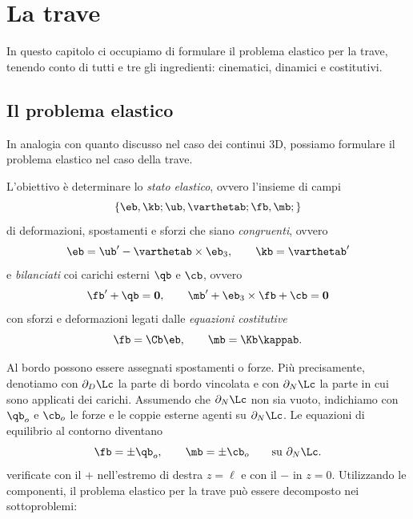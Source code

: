 \chapter{La trave}

 In questo capitolo ci occupiamo di formulare il problema elastico per la trave, tenendo conto di tutti e tre gli ingredienti: cinematici, dinamici e costitutivi. 

\section{Il problema elastico}
In analogia con quanto discusso nel caso dei continui 3D, possiamo formulare il problema elastico nel caso della trave.

L'obiettivo è determinare lo \textit{stato elastico}, ovvero l'insieme di campi
\begin{equation}
\{\eb, \kb ; \ub, \varthetab ;\fb, \mb;  \}
\end{equation}
di deformazioni, spostamenti e sforzi che siano \textit{congruenti}, ovvero
\begin{equation}\label{eqcongrp}
\eb=\ub'-\varthetab\times \eb_3, \qquad \kb=\varthetab'
\end{equation}
e \textit{bilanciati} coi carichi esterni $\qb$ e $\cb$, ovvero
\begin{equation}\label{eqbilp}
\fb'+\qb=\mathbf{0}, \qquad \mb'+\eb_3\times \fb +\cb=\mathbf{0}
\end{equation}
con sforzi e deformazioni legati dalle \textit{equazioni costitutive}
\begin{equation}\label{eqcostp}
\fb=\Cb \eb, \qquad \mb =\Kb \kappab.
\end{equation}

Al bordo possono essere assegnati spostamenti o forze. Più precisamente,  denotiamo con $\partial_D\Lc$ la parte di bordo vincolata e con $\partial_N\Lc$ la parte in cui sono applicati dei carichi. Assumendo che $\partial_N \Lc$ non sia vuoto, indichiamo con $\qb_{o}$ e $\cb_{o}$ le forze e le coppie esterne agenti su  $\partial_N \Lc$. Le equazioni di equilibrio al contorno diventano
\begin{equation}
\fb=\pm \qb_o, \qquad \mb=\pm \cb_{o} \qquad \textrm{su $\partial_N \Lc$}.
\end{equation}
 verificate con il $+$ nell’estremo di destra $z = \ell$ e con il $-$ in $z =0$. Utilizzando le componenti, il problema elastico per la trave può essere decomposto nei  sottoproblemi:

